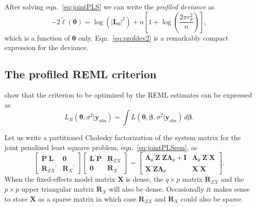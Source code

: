 \documentclass{jss}
\newcommand{\bLt}{\ensuremath{\bm\Lambda_\theta}}
\newcommand{\trans}{\ensuremath{^\prime}}
\newcommand{\yobs}{\ensuremath{\bm y_{\mathrm{obs}}}}
\begin{document}
After solving eqn.~\ref{eq:jointPLS} we can write the \emph{profiled
  deviance} as%
\begin{equation}
  \label{eq:profdev2}
  -2\tilde{\ell}(\bm\theta)=\log(|\bm L_\theta|^2)+
  n\left[1+\log\left(\frac{2\pi r^2_\theta}{n}\right)\right],
\end{equation}%
which is a function of $\bm\theta$ only.  Eqn.~\ref{eq:profdev2} is a
remarkably compact expression for the deviance.

\subsection{The profiled REML criterion}
\label{sec:profiledREML}

\citet{laird_ware_1982} show that the criterion to be optimized by the
REML estimates can be expressed as%
\begin{equation}
  \label{eq:REMLcrit}
  L_R(\bm\theta,\sigma^2|\yobs)=\int
  L(\bm\theta,\bm\beta,\sigma^2|\yobs)\,d\bm\beta .
\end{equation}%

Let us write a partitioned Cholesky factorization of the system matrix
for the joint penalized least squares problem, eqn.~\ref{eq:jointPLSeqn},
as%
\begin{equation}
  \label{eq:fulldecomp}
  \begin{bmatrix}
    \bm P\trans\bm L& \bm 0\\
    \bm R_{ZX}\trans & \bm R_X\trans
  \end{bmatrix}
  \begin{bmatrix}
    \bm L\trans\bm P & \bm R_{ZX}\\
    \bm 0            & \bm R_X
  \end{bmatrix}=
  \begin{bmatrix}
    \bLt\trans\bm Z\trans\bm Z\bLt+\bm I & \bLt\trans\bm Z\trans\bm X\\
    \bm X\trans\bm Z\bLt       & \bm X\trans\bm X
  \end{bmatrix} .
\end{equation}%
When the fixed-effects model matrix $\bm X$ is dense, the $q\times p$
matrix $\bm R_{ZX}$ and the $p\times p$ upper triangular matrix $\bm
R_X$ will also be dense.  Occasionally it makes sense to store $\bm X$
as a sparse matrix in which case $\bm R_{ZX}$ and $\bm R_X$ could also
be sparse.
\end{document}
